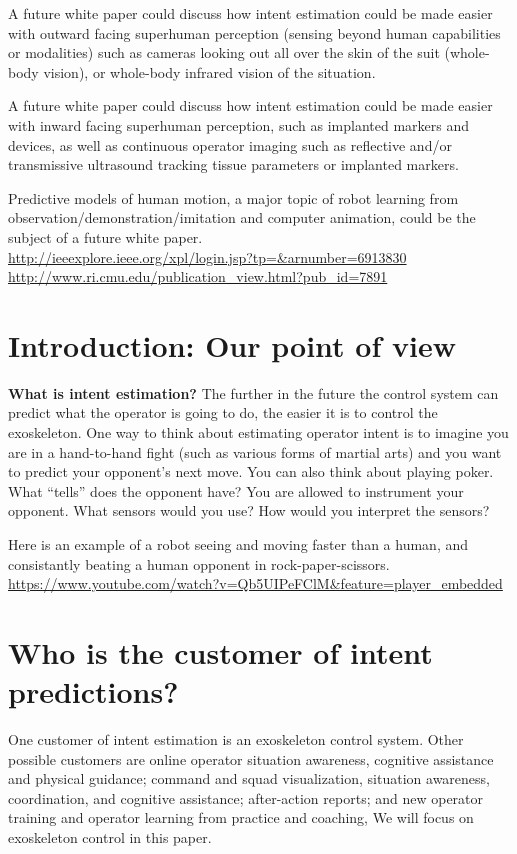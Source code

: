 \documentclass[letterpaper,12pt,fullpage]{article}
\begin{document}
A future white paper could discuss how intent estimation could be 
made easier with outward facing
superhuman perception (sensing beyond human capabilities
or modalities) such as cameras looking out all over the skin
of the suit (whole-body vision), or whole-body 
infrared vision of the situation.

A future white paper could discuss how intent estimation could be 
made easier with inward facing superhuman perception,
such as implanted markers and devices, as well as continuous
operator imaging such as reflective and/or transmissive ultrasound
tracking tissue parameters or implanted markers.

Predictive models of human motion, a major topic of robot learning from\\
observation/demonstration/imitation and computer animation,
could be the subject of a future white
paper.\\
\url{http://ieeexplore.ieee.org/xpl/login.jsp?tp=&arnumber=6913830}\\
\url{http://www.ri.cmu.edu/publication_view.html?pub_id=7891}

\section{Introduction: Our point of view}

{\bf What is intent estimation?}
The further in the future the control system can predict what the operator
is going to do, the easier it is to control the exoskeleton. One way
to think about estimating operator intent is to imagine you are in
a hand-to-hand fight (such as various forms of martial arts)
and you want to predict your opponent's next move.
You can also think about playing poker. What ``tells'' does the opponent
have?
You are allowed to instrument your opponent. What sensors would you use?
How would you interpret the sensors?

Here is an example of a robot seeing and moving faster than a human, and
consistantly beating a human opponent in rock-paper-scissors.\\
\url{https://www.youtube.com/watch?v=Qb5UIPeFClM&feature=player_embedded}

\section{Who is the customer of intent predictions?}

One customer of intent estimation is an exoskeleton control system.
Other possible customers are online operator situation awareness,
cognitive assistance
and physical guidance;
command and squad visualization, situation awareness,
coordination, and cognitive assistance;
after-action reports; and new operator training and
operator learning from practice and coaching,
We will focus on exoskeleton control in this paper.
\end{document}
